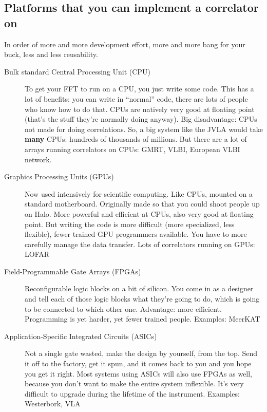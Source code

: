 \documentclass[a4paper]{article}
\begin{document}
\subsection{Platforms that you can implement a correlator on}

In order of more and more development effort, more and more bang for your buck, less and less reusability. 

\begin{description}

\item[Bulk standard Central Processing Unit (CPU)] To get your FFT to run on a CPU, you just write some code. This has a lot of benefits: you can write in ``normal'' code, there are lots of people who know how to do that. CPUs are natively very good at floating point (that's the stuff they're normally doing anyway). Big disadvantage: CPUs not made for doing correlations. So, a big system like the JVLA would take \textbf{many} CPUs: hundreds of thousands of millions. But there are a lot of arrays running correlators on CPUs: GMRT, VLBI, European VLBI network. 

\item[Graphics Processing Units (GPUs)] Now used intensively for scientific computing. Like CPUs, mounted on a standard motherboard. Originally made so that you could shoot people up on Halo. More powerful and efficient at CPUs, also very good at floating point. But writing the code is more difficult (more specialized, less flexible), fewer trained GPU programmers available. You have to more carefully manage the data transfer. Lots of correlators running on GPUs: LOFAR

\item[Field-Programmable Gate Arrays (FPGAs)] Reconfigurable logic blocks on a bit of silicon. You come in as a designer and tell each of those logic blocks what they're going to do, which is going to be connected to which other one. Advantage: more efficient. Programming is yet harder, yet fewer trained people. Examples: MeerKAT

\item[Application-Specific Integrated Circuits (ASICs)] Not a single gate wasted, make the design by yourself, from the top. Send it off to the factory, get it spun, and it comes back to you and you hope you get it right. Most systems using ASICs will also use FPGAs as well, because you don't want to make the entire system inflexible. It's very difficult to upgrade during the lifetime of the instrument. Examples: Westerbork, VLA 

\end{description}
\end{document}
